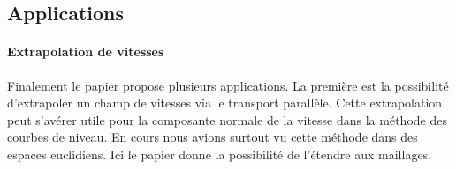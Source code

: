 \documentclass[11pt]{article}
\begin{document}
	\subsection{Applications}
	
	\paragraph{Extrapolation de vitesses}
	Finalement le papier propose plusieurs applications. La première est la possibilité d'extrapoler un champ de vitesses via le transport parallèle. Cette extrapolation peut s'avérer utile pour la composante normale de la vitesse dans la méthode des courbes de niveau. En cours nous avions surtout vu cette méthode dans des espaces euclidiens. Ici le papier donne la possibilité de l'étendre aux maillages.
	
	\appendix
	
	
	
\end{document}
